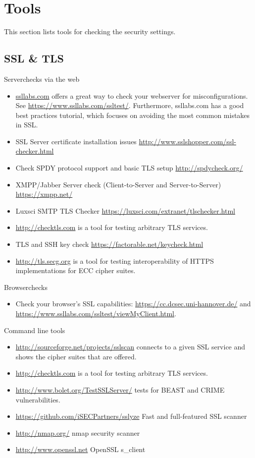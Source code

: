 \section{Tools}
\label{section:Tools}
This section lists tools for checking the security settings.

\subsection{SSL \& TLS}

Serverchecks via the web
\begin{itemize}
\item \href{http://ssllabs.com}{ssllabs.com} offers a great way to check your webserver for misconfigurations. See \url{https://www.ssllabs.com/ssltest/}. Furthermore, ssllabs.com has a good best practices tutorial, which focuses on avoiding the most common mistakes in SSL.
\item SSL Server certificate installation issues \url{http://www.sslshopper.com/ssl-checker.html}
\item Check SPDY protocol support and basic TLS setup \url{http://spdycheck.org/}
\item XMPP/Jabber Server check (Client-to-Server and Server-to-Server) \url{https://xmpp.net/}
\item Luxsci SMTP TLS Checker \url{https://luxsci.com/extranet/tlschecker.html}
\item \url{http://checktls.com} is a tool for testing arbitrary TLS services.
\item TLS and SSH key check \url{https://factorable.net/keycheck.html}
\item \url{http://tls.secg.org} is a tool for testing interoperability of HTTPS implementations for ECC cipher suites.
\end{itemize}

Browserchecks
\begin{itemize}
\item Check your browser's SSL capabilities: \url{https://cc.dcsec.uni-hannover.de/} and \url{https://www.ssllabs.com/ssltest/viewMyClient.html}.
\end{itemize}


Command line tools
\begin{itemize}
\item \url{http://sourceforge.net/projects/sslscan} connects to a given SSL service and shows the cipher suites that are offered.
\item \url{http://checktls.com} is a tool for testing arbitrary TLS services. 
\item \url{http://www.bolet.org/TestSSLServer/} tests for BEAST and CRIME vulnerabilities.
\item \url{https://github.com/iSECPartners/sslyze} Fast and full-featured SSL scanner
\item \url{http://nmap.org/} nmap security scanner
\item \url{http://www.openssl.net} OpenSSL s\_client
\end{itemize}


